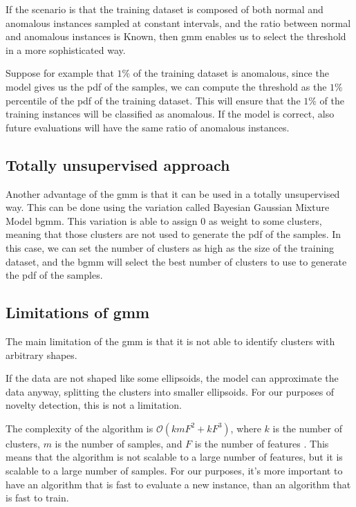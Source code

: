 If the scenario is that the training dataset is composed of both normal and anomalous instances sampled at constant intervals, and the ratio between normal and anomalous instances is Known, then \gls{gmm} enables us to select the threshold in a more sophisticated way.

Suppose for example that $1\%$ of the training dataset is anomalous, since the model gives us the \gls{pdf} of the samples, we can compute the threshold as the $1\%$ percentile of the \gls{pdf} of the training dataset. This will ensure that the $1\%$ of the training instances will be classified as anomalous. If the model is correct, also future evaluations will have the same ratio of anomalous instances.

\subsection{Totally unsupervised approach}
\label{sec:gauss_unsupervised}
Another advantage of the \gls{gmm} is that it can be used in a totally unsupervised way. This can be done using the variation called Bayesian Gaussian Mixture Model \gls{bgmm}. This variation is able to assign $0$ as 
weight to some clusters, meaning that those clusters are not used to generate the \gls{pdf} of the samples. In this case, we can set the number of clusters as high as the size of the training dataset, and the \gls{bgmm} will select the best number of clusters to use to generate the \gls{pdf} of the samples. 

\subsection{Limitations of \gls{gmm}}
The main limitation of the \gls{gmm} is that it is not able to identify clusters with arbitrary shapes.

If the data are not shaped like some ellipsoids, the model can approximate the data anyway, splitting the clusters into smaller ellipsoids. For our purposes of novelty detection, this is not a limitation.

The complexity of the algorithm is $\mathcal{O}(kmF^2+kF^3)$, where $k$ is the number of clusters, $m$ is the number of samples, and $F$ is the number of features . This means that the algorithm is not scalable to a large number of features, but it is scalable to a large number of samples.
For our purposes, it's more important to have an algorithm that is fast to evaluate a new instance, than an algorithm that is fast to train.